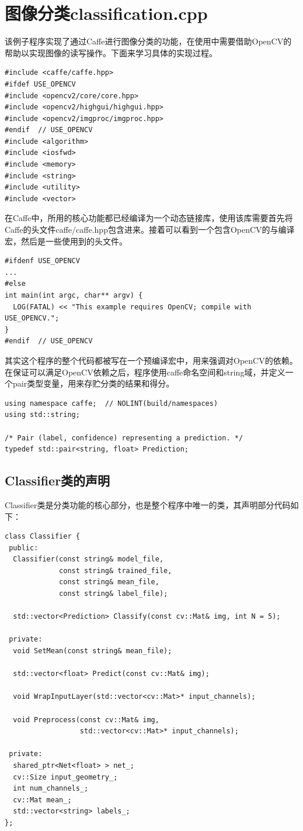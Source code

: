 \section{图像分类classification.cpp}
该例子程序实现了通过Caffe进行图像分类的功能，在使用中需要借助OpenCV的帮助以实现图像的读写操作。下面来学习具体的实现过程。
\begin{verbatim}
#include <caffe/caffe.hpp>
#ifdef USE_OPENCV
#include <opencv2/core/core.hpp>
#include <opencv2/highgui/highgui.hpp>
#include <opencv2/imgproc/imgproc.hpp>
#endif  // USE_OPENCV
#include <algorithm>
#include <iosfwd>
#include <memory>
#include <string>
#include <utility>
#include <vector>
\end{verbatim}
在Caffe中，所用的核心功能都已经编译为一个动态链接库，使用该库需要首先将Caffe的头文件caffe/caffe.hpp包含进来。接着可以看到一个包含OpenCV的与编译宏，然后是一些使用到的头文件。
\begin{verbatim}
#ifdenf USE_OPENCV
...
#else
int main(int argc, char** argv) {
  LOG(FATAL) << "This example requires OpenCV; compile with USE_OPENCV.";
}
#endif  // USE_OPENCV
\end{verbatim}
其实这个程序的整个代码都被写在一个预编译宏中，用来强调对OpenCV的依赖。
在保证可以满足OpenCV依赖之后，程序使用caffe命名空间和string域，并定义一个pair类型变量，用来存贮分类的结果和得分。
\begin{verbatim}
using namespace caffe;  // NOLINT(build/namespaces)
using std::string;

/* Pair (label, confidence) representing a prediction. */
typedef std::pair<string, float> Prediction;
\end{verbatim}

\subsection{Classifier类的声明}
Classifier类是分类功能的核心部分，也是整个程序中唯一的类，其声明部分代码如下：
\begin{verbatim}
class Classifier {
 public:
  Classifier(const string& model_file,
             const string& trained_file,
             const string& mean_file,
             const string& label_file);

  std::vector<Prediction> Classify(const cv::Mat& img, int N = 5);

 private:
  void SetMean(const string& mean_file);

  std::vector<float> Predict(const cv::Mat& img);

  void WrapInputLayer(std::vector<cv::Mat>* input_channels);

  void Preprocess(const cv::Mat& img,
                  std::vector<cv::Mat>* input_channels);

 private:
  shared_ptr<Net<float> > net_;
  cv::Size input_geometry_;
  int num_channels_;
  cv::Mat mean_;
  std::vector<string> labels_;
};
\end{verbatim}

